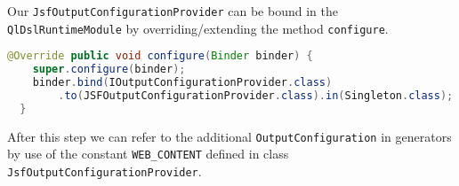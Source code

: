Our \texttt{JsfOutputConfigurationProvider} can be bound in the
\texttt{QlDslRuntimeModule} by overriding/extending the method
\texttt{configure}.

\begin{lstlisting}[language=Java]
@Override public void configure(Binder binder) {
    super.configure(binder);
    binder.bind(IOutputConfigurationProvider.class)
        .to(JSFOutputConfigurationProvider.class).in(Singleton.class);
  }
 \end{lstlisting}
 
After this step we can refer to the additional \texttt{OutputConfiguration} in
generators by use of the constant \texttt{WEB\_CONTENT} defined in class
\texttt{JsfOutputConfigurationProvider}.